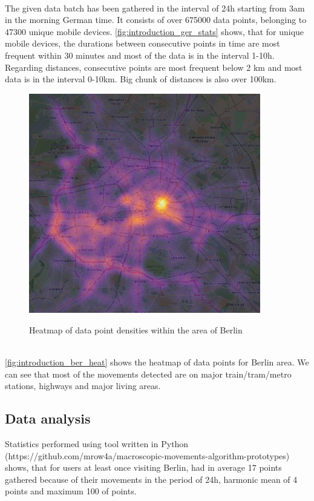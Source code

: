\\
The given data batch has been gathered in the interval of 24h starting from 3am in the morning German time. It consists of over 675000 data points, belonging to 47300 unique mobile devices. \autoref{fig:introduction_ger_stats} shows, that for unique mobile devices, the durations between consecutive points in time are most frequent within 30 minutes and most of the data is in the interval 1-10h. Regarding distances, consecutive points are most frequent below 2 km and most data is in the interval 0-10km. Big chunk of distances is also over 100km.     
\\
\begin{figure}[!ht]
	\centering
	\includegraphics[width=0.9\textwidth]{images/points_berlin_heatmap.png}\\
	\caption{Heatmap of data point densities within the area of Berlin}
	\label{fig:introduction_ber_heat}
\end{figure}
\\
\autoref{fig:introduction_ber_heat} shows the heatmap of data points for Berlin area. We can see that most of the movements detected are on major train/tram/metro stations, highways and major living areas. 

\subsection{Data analysis}
\label{cha:introduction_dataanaly}

Statistics performed using tool written in Python (https://github.com/mrow4a/macroscopic-movements-algorithm-prototypes) shows, that for users at least once visiting Berlin, had in average 17 points gathered because of their movements in the period of 24h, harmonic mean of 4 points and maximum 100 of points.

